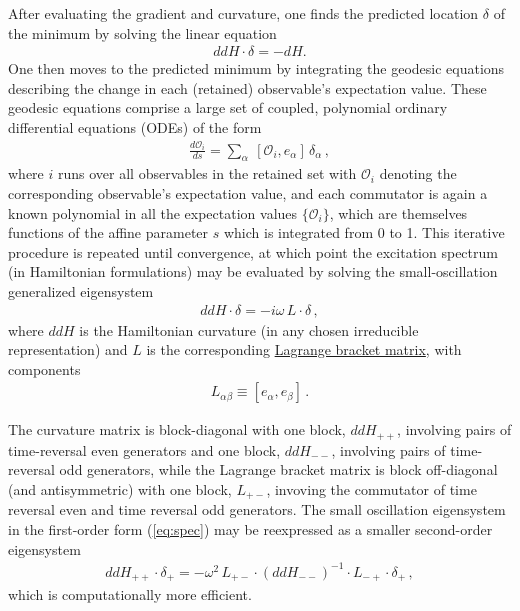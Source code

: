 \documentclass [12pt]{article}
\begin{document}
After evaluating the gradient and curvature,
one finds the predicted location $\delta$ of the
minimum by solving the linear equation
\begin{align}
    ddH \cdot \delta = -dH .
\label{eq:delta}
\end{align}
One then moves to the predicted minimum by
integrating the geodesic equations describing the change
in each (retained) observable's expectation value.
These geodesic equations comprise a large set of coupled,
polynomial ordinary differential equations (ODEs) of the form
\begin{align}
    \frac{d \mathcal O_i}{ds}
    =
    \sum_\alpha \> [\mathcal O_i, e_\alpha] \,\delta_\alpha \,,
\end{align}
where $i$ runs over all observables in the retained set with 
$\mathcal O_i$ denoting the corresponding observable's expectation value,
and each commutator is again a known polynomial in all the
expectation values $\{ \mathcal O_i \}$,
which are themselves functions of the affine parameter $s$
which is integrated from 0 to 1.
%
This iterative procedure is repeated until convergence,
at which point the excitation spectrum (in Hamiltonian
formulations) may be evaluated by solving the
small-oscillation generalized eigensystem
\begin{align}
    ddH \cdot \delta = -i\omega \, L \cdot \delta \,,
\label{eq:spec}
\end{align}
where $ddH$ is the Hamiltonian curvature
(in any chosen irreducible representation)
and $L$ is the corresponding
\href{https://en.wikipedia.org/wiki/Lagrange_bracket}
{Lagrange bracket matrix},
with components
\begin{align}
    L_{\alpha\beta} \equiv [e_\alpha, e_\beta] \,.
\end{align}

The curvature matrix is block-diagonal with one block,
$ddH_{++}$, involving pairs of time-reversal even generators
and one block, $ddH_{--}$, involving pairs of time-reversal
odd generators,
while the Lagrange bracket matrix is block off-diagonal
(and antisymmetric)
with one block, $L_{+-}$, invoving the
commutator of time reversal even and time reversal odd generators.
The small oscillation eigensystem in the first-order form (\ref{eq:spec})
may be reexpressed as a smaller second-order eigensystem
\begin{align}
    ddH_{++} \cdot \delta_+ = -\omega^2 \,
    L_{+-} \cdot (ddH_{--})^{-1} \cdot L_{-+} \cdot \delta_+ \,,
\end{align}
which is computationally more efficient.
\end{document}
